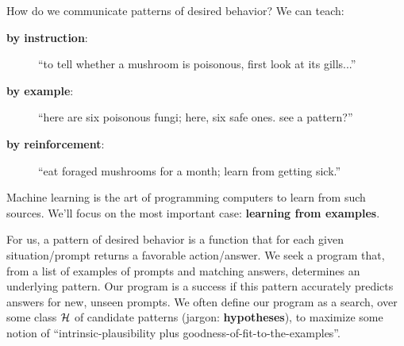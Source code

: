 

  How do we communicate patterns of desired behavior?  We can teach:
  \begin{description}
    \item[\textbf{by instruction}:  ]  ``to tell whether a mushroom is poisonous, first look at its gills...''
    \item[\textbf{by example}:      ]  ``here are six poisonous fungi; here, six safe ones.  see a pattern?''
    \item[\textbf{by reinforcement}:]  ``eat foraged mushrooms for a month; learn from getting sick.''
  \end{description}
  Machine learning is the art of programming computers to learn from such
  sources.  We'll focus on the most important case: \textbf{learning from
  examples}.

  For us, a pattern of desired behavior is a function that for each given
  situation/prompt returns a favorable action/answer.
  We seek a program that, from a list of examples of prompts and matching
  answers, determines an underlying pattern.  Our program is a success if this
  pattern accurately predicts answers for new, unseen prompts.
  We often define our program as a search, over some class $\mathcal{H}$ of candidate
  patterns (jargon: \textbf{hypotheses}), to maximize some notion of
  ``intrinsic-plausibility plus goodness-of-fit-to-the-examples''.

